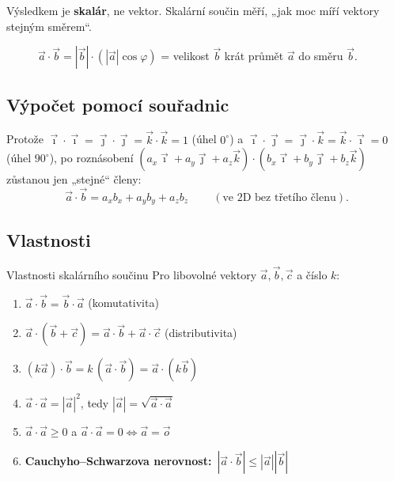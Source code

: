 \documentclass[a4paper,11pt]{article}
\newcommand{\abs}[1]{\left\lvert #1\right\rvert}
\newcommand{\ii}{\vec{\imath}}
\newcommand{\jj}{\vec{\jmath}}
\newcommand{\kk}{\vec{k}}
\begin{document}
Výsledkem je \textbf{skalár}, ne vektor. Skalární součin měří, „jak moc míří vektory
stejným směrem“.

\begin{figure}[!htbp]
\centering
{}
\caption{$\vec a\cdot\vec b=\abs{\vec b}\cdot(\abs{\vec a}\cos\varphi)$ = velikost $\vec b$ krát
průmět $\vec a$ do směru $\vec b$.}
\end{figure}

\subsection{Výpočet pomocí souřadnic}

Protože $\ii\cdot\ii=\jj\cdot\jj=\kk\cdot\kk=1$ (úhel $0^\circ$) a
$\ii\cdot\jj=\jj\cdot\kk=\kk\cdot\ii=0$ (úhel $90^\circ$), po roznásobení
$(a_x\ii+a_y\jj+a_z\kk)\cdot(b_x\ii+b_y\jj+b_z\kk)$ zůstanou jen „stejné“ členy:
\begin{equation}
  \boxed{\ \vec a\cdot\vec b=a_xb_x+a_yb_y+a_zb_z\ }
  \qquad(\text{ve 2D bez třetího členu}).
\end{equation}

\subsection{Vlastnosti}

\begin{veta}{Vlastnosti skalárního součinu}
Pro libovolné vektory $\vec a,\vec b,\vec c$ a číslo $k$:
\begin{enumerate}[label=(\roman*),nosep]
  \item $\vec a\cdot\vec b=\vec b\cdot\vec a$ \hfill (komutativita)
  \item $\vec a\cdot(\vec b+\vec c)=\vec a\cdot\vec b+\vec a\cdot\vec c$ \hfill (distributivita)
  \item $(k\vec a)\cdot\vec b=k\,(\vec a\cdot\vec b)=\vec a\cdot(k\vec b)$
  \item $\vec a\cdot\vec a=\abs{\vec a}^2$, tedy $\abs{\vec a}=\sqrt{\vec a\cdot\vec a}$
  \item $\vec a\cdot\vec a\ge0$ a $\vec a\cdot\vec a=0\iff\vec a=\vec o$
  \item \textbf{Cauchyho--Schwarzova nerovnost:}\ $\abs{\vec a\cdot\vec b}\le\abs{\vec a}\abs{\vec b}$
\end{enumerate}
\end{veta}
\end{document}
